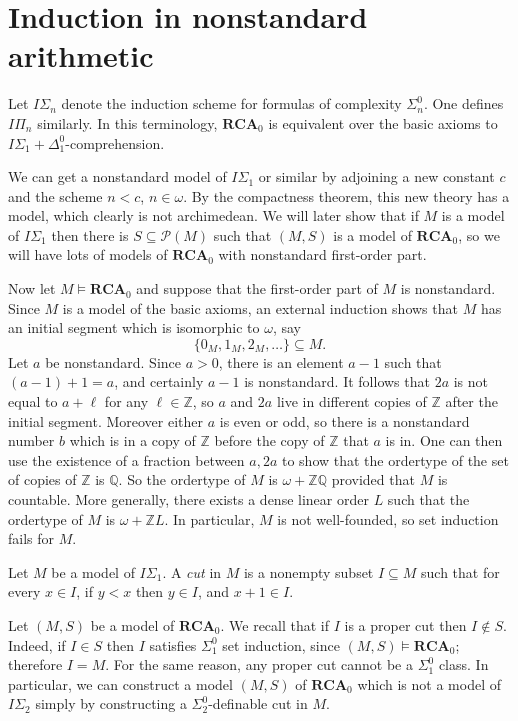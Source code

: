 \documentclass[12pt]{book}
\newcommand{\ZZ}{\mathbb{Z}}
\newcommand{\QQ}{\mathbb{Q}}
\newcommand{\RCA}{\mathbf{RCA}}
\newcommand{\dfn}[1]{\emph{#1}\index{#1}}
\theoremstyle{definition}
\newenvironment{definition}
  {\pushQED{\qed}\renewcommand{\qedsymbol}{$\diamondsuit$}\definitionx}
  {\popQED\endexamplex}
\begin{document}
\section{Induction in nonstandard arithmetic}
Let $I\Sigma_n$ denote the induction scheme for formulas of complexity $\Sigma_n^0$.
One defines $I\Pi_n$ similarly.
In this terminology, $\RCA_0$ is equivalent over the basic axioms to $I\Sigma_1 + \Delta_1^0$-comprehension.

We can get a nonstandard model of $I\Sigma_1$ or similar by adjoining a new constant $c$ and the scheme $n < c$, $n \in \omega$.
By the compactness theorem, this new theory has a model, which clearly is not archimedean.
We will later show that if $M$ is a model of $I\Sigma_1$ then there is $S \subseteq \mathscr P(M)$ such that $(M, S)$ is a model of $\RCA_0$, so we will have lots of models of $\RCA_0$ with nonstandard first-order part.

Now let $M \models \RCA_0$ and suppose that the first-order part of $M$ is nonstandard.
Since $M$ is a model of the basic axioms, an external induction shows that $M$ has an initial segment which is isomorphic to $\omega$, say
$$\{0_M, 1_M, 2_M, \dots\} \subseteq M.$$
Let $a$ be nonstandard. Since $a > 0$, there is an element $a - 1$ such that $(a - 1) + 1 = a$, and certainly $a - 1$ is nonstandard.
It follows that $2a$ is not equal to $a + \ell$ for any $\ell \in \ZZ$, so $a$ and $2a$ live in different copies of $\ZZ$ after the initial segment.
Moreover either $a$ is even or odd, so there is a nonstandard number $b$ which is in a copy of $\ZZ$ before the copy of $\ZZ$ that $a$ is in.
One can then use the existence of a fraction between $a,2a$ to show that the ordertype of the set of copies of $\ZZ$ is $\QQ$.
So the ordertype of $M$ is $\omega + \ZZ\QQ$ provided that $M$ is countable.
More generally, there exists a dense linear order $L$ such that the ordertype of $M$ is $\omega + \ZZ L$.
In particular, $M$ is not well-founded, so set induction fails for $M$.

\begin{definition}
Let $M$ be a model of $I\Sigma_1$.
A \dfn{cut} in $M$ is a nonempty subset $I \subseteq M$ such that for every $x \in I$, if $y < x$ then $y \in I$, and $x + 1 \in I$.
\end{definition}

Let $(M, S)$ be a model of $\RCA_0$.
We recall that if $I$ is a proper cut then $I \notin S$.
Indeed, if $I \in S$ then $I$ satisfies $\Sigma_1^0$ set induction, since $(M, S) \models \RCA_0$; therefore $I = M$.
For the same reason, any proper cut cannot be a $\Sigma_1^0$ class.
In particular, we can construct a model $(M, S)$ of $\RCA_0$ which is not a model of $I\Sigma_2$ simply by constructing a $\Sigma_2^0$-definable cut in $M$.
\end{document}
